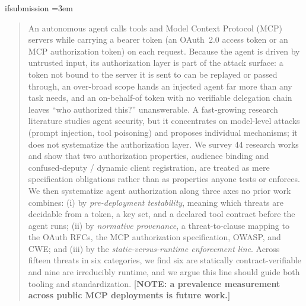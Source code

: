 \ifdefined\ifsubmission\else\expandafter\newif\csname ifsubmission\endcsname\submissiontrue\fi
\providecommand{\gate}[1]{\ifsubmission #1\else \textbf{[PENDING: #1]}\fi}
\providecommand{\draftonly}[1]{\ifsubmission\else \textbf{[NOTE: #1]}\fi}
\providecommand{\yes}{\ensuremath{\surd}}
\providecommand{\no}{\ensuremath{\times}}
\emergencystretch=3em

\begin{abstract}
An autonomous agent calls tools and Model Context Protocol (MCP) servers while
carrying a bearer token (an OAuth~2.0 access token or an MCP authorization token)
on each request. Because the agent is driven by untrusted input, its authorization
layer is part of the attack surface: a token not bound to the server it is sent to
can be replayed or passed through, an over-broad scope hands an injected agent far
more than any task needs, and an on-behalf-of token with no verifiable delegation
chain leaves ``who authorized this?'' unanswerable. A fast-growing research
literature studies agent security, but it concentrates on model-level attacks
(prompt injection, tool poisoning) and proposes individual mechanisms; it does not
systematize the authorization layer. We survey 44 research works and show that two
authorization properties, audience binding and confused-deputy / dynamic client
registration, are treated as mere specification obligations rather than as
properties anyone tests or enforces. We then systematize agent authorization along
three axes no prior work combines: (i) by \emph{pre-deployment testability}, meaning
which threats are decidable from a token, a key set, and a declared tool contract
before the agent runs; (ii) by \emph{normative provenance}, a threat-to-clause mapping to
the OAuth RFCs, the MCP authorization specification, OWASP, and CWE; and (iii) by the
\emph{static-versus-runtime enforcement line}. Across fifteen threats in six
categories, we find six are statically contract-verifiable and nine are irreducibly
runtime, and we argue this line should guide both tooling and standardization.
\draftonly{a prevalence measurement across public MCP deployments is future work.}
\end{abstract}

